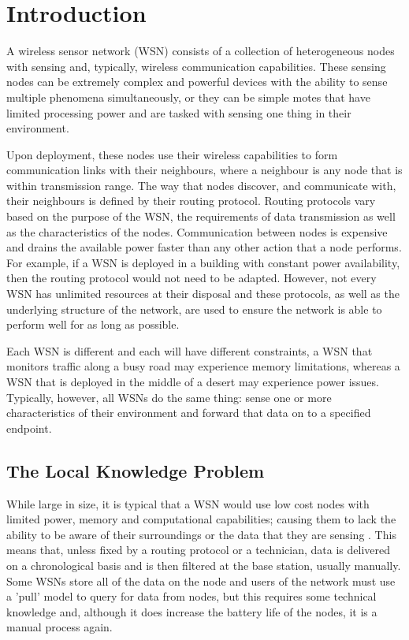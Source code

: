 \chapter{Introduction}
A wireless sensor network (WSN) consists of a collection of heterogeneous nodes with sensing and, typically, wireless communication capabilities. These sensing nodes can be extremely complex and powerful devices with the ability to sense multiple phenomena simultaneously, or they can be simple motes that have limited processing power and are tasked with sensing one thing in their environment.

Upon deployment, these nodes use their wireless capabilities to form communication links with their neighbours, where a neighbour is any node that is within transmission range. The way that nodes discover, and communicate with, their neighbours is defined by their routing protocol. Routing protocols vary based on the purpose of the WSN, the requirements of data transmission as well as the characteristics of the nodes. Communication between nodes is expensive and drains the available power faster than any other action that a node performs. For example, if a WSN is deployed in a building with constant power availability, then the routing protocol would not need to be adapted. However, not every WSN has unlimited resources at their disposal and these protocols, as well as the underlying structure of the network, are used to ensure the network is able to perform well for as long as possible.

Each WSN is different and each will have different constraints, a WSN that monitors traffic along a busy road may experience memory limitations, whereas a  WSN that is deployed in the middle of a desert may experience power issues. Typically, however, all WSNs do the same thing: sense one or more characteristics of their environment and forward that data on to a specified endpoint.

\section{The Local Knowledge Problem}
While large in size, it is typical that a WSN would use low cost nodes with limited power, memory and computational capabilities; causing them to lack the ability to be aware of their surroundings or the data that they are sensing \cite{Akyildiz2002}. This means that, unless fixed by a routing protocol or a technician, data is delivered on a chronological basis and is then filtered at the base station, usually manually. Some WSNs store all of the data on the node and users of the network must use a 'pull' model to query for data from nodes, but this requires some technical knowledge and, although it does increase the battery life of the nodes, it is a manual process again.

